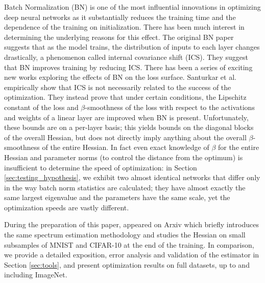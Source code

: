 \documentclass{article}
\begin{document}
Batch Normalization (BN) \cite{ioffe2015batch} is one of the most influential innovations in optimizing deep neural networks as it substantially reduces the training time and the dependence of the training on initialization. There has been much interest in determining the underlying reasons for this effect. The original BN paper suggests that as the model trains, the distribution of inputs to each layer changes drastically, a phenomenon called internal covariance shift (ICS). They suggest that BN improves training by reducing ICS. There has been a series of exciting new works exploring the effects of BN on the loss surface. Santurkar et al. \ \cite{santurkar2018does} empirically show that ICS is not necessarily related to the success of the optimization. They instead prove that under certain conditions, the Lipschitz constant of the loss and $\beta$-smoothness of the loss with respect to the activations and weights of a linear layer are improved when BN is present. Unfortunately, these bounds are on a per-layer basis; this yields bounds on the diagonal blocks of the overall Hessian, but does not directly imply anything about the overall $\beta$-smoothness of the entire Hessian.
In fact even exact knowledge of $\beta$ for the entire Hessian and parameter norms (to control the distance from the optimum) is insufficient to determine the speed of optimization: in Section \ref{sec:testing_hypothesis}, we exhibit two almost identical networks that differ only in the way batch norm statistics are calculated; they have almost exactly the same largest eigenvalue and the parameters have the same scale, yet the optimization speeds are vastly different. 

During the preparation of this paper, \cite{papyan2018full} appeared on Arxiv which briefly introduces the same spectrum estimation methodology and studies the Hessian on small subsamples of MNIST and CIFAR-10 at the end of the training. In comparison, we provide a detailed exposition, error analysis and validation of the estimator in Section \ref{sec:tools}, and present optimization results on full datasets, up to and including ImageNet.
\end{document}
